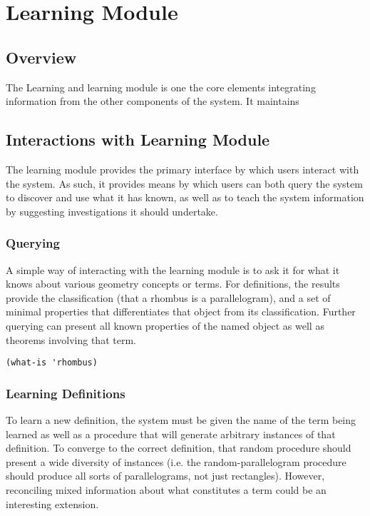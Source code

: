\chapter{Learning Module}
\label{chap:analyzer}

\section{Overview}

The Learning and learning module is one the core elements integrating
information from the other components of the system. It maintains

\section{Interactions with Learning Module}

The learning module provides the primary interface by which users
interact with the system. As such, it provides means by which users
can both query the system to discover and use what it has known, as
well as to teach the system information by suggesting investigations
it should undertake.

\subsection{Querying}

A simple way of interacting with the learning module is to ask it for
what it knows about various geometry concepts or terms. For
definitions, the results provide the classification (that a rhombus is
a parallelogram), and a set of minimal properties that differentiates
that object from its classification. Further querying can present all
known properties of the named object as well as theorems involving
that term.

\begin{verbatim}
(what-is 'rhombus)
\end{verbatim}

\subsection{Learning Definitions}

To learn a new definition, the system must be given the name of the
term being learned as well as a procedure that will generate arbitrary
instances of that definition. To converge to the correct definition,
that random procedure should present a wide diversity of instances
(i.e. the random-parallelogram procedure should produce all sorts of
parallelograms, not just rectangles). However, reconciling mixed
information about what constitutes a term could be an interesting
extension.

